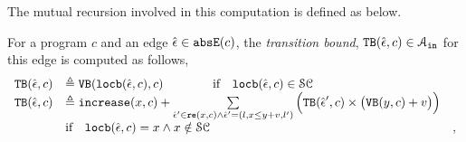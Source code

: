 \begin{enumerate}
The mutual recursion involved in this computation is defined as below.
\begin{defn}
 \label{def:edge_pathinsensitivebound}
 For a program $c$ and an edge $\hat{\mathtt{\epsilon}{}} \in \mathtt{abs}{\mathtt{E}}(c)$, the \emph{transition bound},
 ${\mathtt{TB}}(\hat{\mathtt{\epsilon}{}}, c) \in \mathcal{A}_{\mathtt{in}}$ 
for this edge is
computed as follows,
\[ 
\begin{array}{lll}
 {\ensuremath{\mathtt{TB}}}(\hat{\mathtt{\epsilon}{}}, c) 
 & \triangleq {\ensuremath{\mathtt{VB}}}(\mathtt{locb}(\hat{\mathtt{\epsilon}{}}, c), c) \qquad \qquad \text{if} \quad \mathtt{locb}(\hat{\mathtt{\epsilon}{}}, c) \in \mathcal{SC} & \\
 {\mathtt{TB}}(\hat{\mathtt{\epsilon}{}}, c) 
 & \triangleq \mathtt{increase}(x, c) 
 + 
 \sum\limits_{\hat{\mathtt{\epsilon}{}}' \in \mathtt{re}(x, c) \land \hat{\mathtt{\epsilon}{}}' = (l, x \leq y + v, l') }
 \Big( {\mathtt{TB}}(\hat{\mathtt{\epsilon}{}}', c) \times \big( {\mathtt{VB}}(y, c) + v \big) \Big)
 & \\
 & \text{if} \quad \mathtt{locb}(\hat{\mathtt{\epsilon}{}}, c) = x \land x \notin \mathcal{SC} & ,
\end{array}
 \]
\end{defn}


\end{enumerate}
